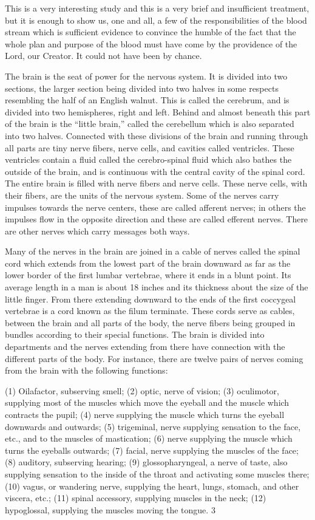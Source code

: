 This is a very interesting study and this is a very brief and insufficient treatment, but it is
enough to show us, one and all, a few of the responsibilities of the blood stream which is
sufficient evidence to convince the humble of the fact that the whole plan and purpose of the
blood must have come by the providence of the Lord, our Creator. It could not have been by
chance.

The brain is the seat of power for the nervous system. It is divided into two sections, the
larger section being divided into two halves in some respects resembling the half of an
English walnut. This is called the cerebrum, and is divided into two hemispheres, right and
left. Behind and almost beneath this part of the brain is the ``little brain,'' called the
cerebellum which is also separated into two halves. Connected with these divisions of the
brain and running through all parts are tiny nerve fibers, nerve cells, and cavities called
ventricles. These ventricles contain a fluid called the cerebro-spinal fluid which also bathes
the outside of the brain, and is continuous with the central cavity of the spinal cord. The
entire brain is filled with nerve fibers and nerve cells. These nerve cells, with their fibers, are
the units of the nervous system. Some of the nerves carry impulses towards the nerve centers,
these are called afferent nerves; in others the impulses flow in the opposite direction and
these are called efferent nerves. There are other nerves which carry messages both ways.

Many of the nerves in the brain are joined in a cable of nerves called the spinal cord which
extends from the lowest part of the brain downward as far as the lower border of the first
lumbar vertebrae, where it ends in a blunt point. Its average length in a man is about 18
inches and its thickness about the size of the little finger. From there extending downward to
the ends of the first coccygeal vertebrae is a cord known as the filum terminate. These cords
serve as cables, between the brain and all parts of the body, the nerve fibers being grouped in
bundles according to their special functions. The brain is divided into departments and the
nerves extending from there have connection with the different parts of the body. For
instance, there are twelve pairs of nerves coming from the brain with the following functions:

(1) Oilafactor, subserving smell; (2) optic, nerve of vision; (3) oculimotor, supplying most of
the muscles which move the eyeball and the muscle which contracts the pupil; (4) nerve
supplying the muscle which turns the eyeball downwards and outwards; (5) trigeminal, nerve
supplying sensation to the face, etc., and to the muscles of mastication; (6) nerve supplying
the muscle which turns the eyeballs outwards; (7) facial, nerve supplying the muscles of the
face; (8) auditory, subserving hearing; (9) glossopharyngeal, a nerve of taste, also supplying
sensation to the inside of the throat and activating some muscles there; (10) vagus, or
wandering nerve, supplying the heart, lungs, stomach, and other viscera, etc.; (11) spinal
accessory, supplying muscles in the neck; (12) hypoglossal, supplying the muscles moving
the tongue. 3

